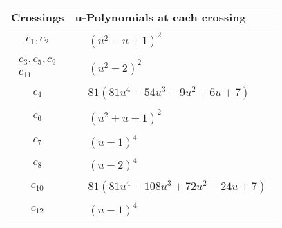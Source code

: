\documentclass[1p]{elsarticle_modified}
\theoremstyle{definition}
\begin{document}
\begin{tabular}{m{50pt}|m{274pt}}
Crossings & \hspace{64pt}u-Polynomials at each crossing \\
\hline $$\begin{aligned}c_{1},c_{2}\end{aligned}$$&$\begin{aligned}
&(u^2- u+1)^2
\end{aligned}$\\
\hline $$\begin{aligned}c_{3},c_{5},c_{9}\\c_{11}\end{aligned}$$&$\begin{aligned}
&(u^2-2)^2
\end{aligned}$\\
\hline $$\begin{aligned}c_{4}\end{aligned}$$&$\begin{aligned}
&81(81 u^4-54 u^3-9 u^2+6 u+7)
\end{aligned}$\\
\hline $$\begin{aligned}c_{6}\end{aligned}$$&$\begin{aligned}
&(u^2+u+1)^2
\end{aligned}$\\
\hline $$\begin{aligned}c_{7}\end{aligned}$$&$\begin{aligned}
&(u+1)^4
\end{aligned}$\\
\hline $$\begin{aligned}c_{8}\end{aligned}$$&$\begin{aligned}
&(u+2)^4
\end{aligned}$\\
\hline $$\begin{aligned}c_{10}\end{aligned}$$&$\begin{aligned}
&81(81 u^4-108 u^3+72 u^2-24 u+7)
\end{aligned}$\\
\hline $$\begin{aligned}c_{12}\end{aligned}$$&$\begin{aligned}
&(u-1)^4
\end{aligned}$\\
\hline
\end{tabular}\\~\\
\end{document}
